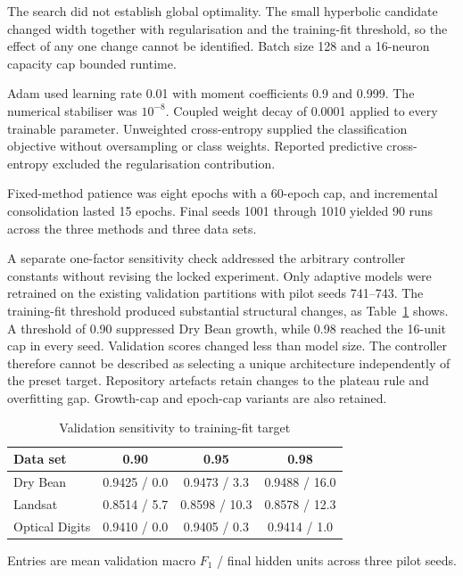 \documentclass[conference,10pt]{IEEEtran}
\begin{document}
The search did not establish global optimality. The small hyperbolic candidate changed width together with regularisation and the training-fit threshold, so the effect of any one change cannot be identified. Batch size 128 and a 16-neuron capacity cap bounded runtime.

Adam used learning rate 0.01 with moment coefficients 0.9 and 0.999. The numerical stabiliser was $10^{-8}$. Coupled weight decay of 0.0001 applied to every trainable parameter. Unweighted cross-entropy supplied the classification objective without oversampling or class weights. Reported predictive cross-entropy excluded the regularisation contribution.

Fixed-method patience was eight epochs with a 60-epoch cap, and incremental consolidation lasted 15 epochs. Final seeds 1001 through 1010 yielded 90 runs across the three methods and three data sets.

A separate one-factor sensitivity check addressed the arbitrary controller constants without revising the locked experiment. Only adaptive models were retrained on the existing validation partitions with pilot seeds 741--743. The training-fit threshold produced substantial structural changes, as Table~\ref{tab:sensitivity} shows. A threshold of 0.90 suppressed Dry Bean growth, while 0.98 reached the 16-unit cap in every seed. Validation scores changed less than model size. The controller therefore cannot be described as selecting a unique architecture independently of the preset target. Repository artefacts retain changes to the plateau rule and overfitting gap. Growth-cap and epoch-cap variants are also retained.

\begin{table}[t]
\caption{Validation sensitivity to training-fit target}
\label{tab:sensitivity}
\centering
\begin{tabular}{@{}lccc@{}}
\toprule
Data set & 0.90 & 0.95 & 0.98 \\
\midrule
Dry Bean & 0.9425 / 0.0 & 0.9473 / 3.3 & 0.9488 / 16.0 \\
Landsat & 0.8514 / 5.7 & 0.8598 / 10.3 & 0.8578 / 12.3 \\
Optical Digits & 0.9410 / 0.0 & 0.9405 / 0.3 & 0.9414 / 1.0 \\
\bottomrule
\end{tabular}
\par\vspace{4pt}
\begin{minipage}{0.98\columnwidth}\footnotesize Entries are mean validation macro $F_1$ / final hidden units across three pilot seeds.\end{minipage}
\end{table}
\end{document}
